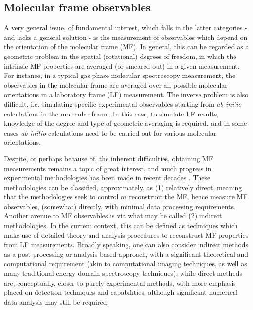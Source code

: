 \subsection{Molecular frame observables\label{sec:MF-intro}}

A very general issue, of fundamental interest, which falls in the latter categories - and lacks a general solution - is the measurement of observables which depend on the orientation of the molecular frame (MF). In general, this can be regarded as a geometric problem in the spatial (rotational) degrees of freedom, in which the intrinsic MF properties are averaged (or smeared out) in a given measurement. For instance, in a typical gas phase molecular spectroscopy measurement, the observables in the molecular frame  are averaged over all possible molecular orientations in a laboratory frame (LF) measurement. The inverse problem is also difficult, i.e. simulating specific experimental observables starting from \textit{ab initio} calculations in the molecular frame. In this case, to simulate LF results, knowledge of the degree and type of geometric averaging is required, and in some cases \textit{ab initio} calculations need to be carried out for various molecular orientations.

Despite, or perhaps because of, the inherent difficulties, obtaining  MF measurements remains a topic of great interest, and much progress in experimental methodologies has been made in recent decades \cite{Becker1998,Reid2003,Reid2012,kleinpoppen2013perfect,Yagishita2015,hockett2018QuantumMetrologyPhotoelectrons}. %
These methodologies can be classified, approximately, as (1) relatively direct, meaning that the methodologies seek to control or reconstruct the MF, hence measure MF observables, (somewhat) directly, with minimal data processing requirements. Another avenue to MF observables is via what may be called (2) indirect methodologies. In the current context, this can be defined as techniques which make use of detailed theory and analysis procedures to reconstruct MF properties from LF measurements. Broadly speaking, one can also consider indirect methods as a post-processing or analysis-based approach, with a significant theoretical and computational requirement (akin to computational imaging techniques, as well as many traditional energy-domain spectroscopy techniques), while direct methods are, conceptually, closer to purely experimental methods, with more emphasis placed on detection techniques and capabilities, although significant numerical data analysis may still be required. 

